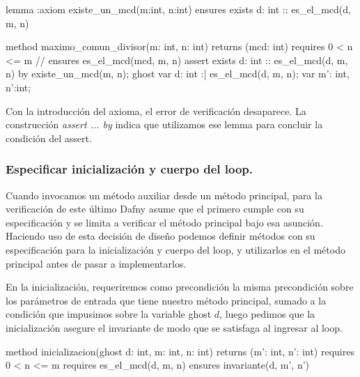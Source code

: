 \documentclass[12pt, a4paper, openany, fleqn]{book}
\begin{document}
    \begin{greenbox}
    \begin{dafny}[gobble=8]
        lemma {:axiom} existe_un_mcd(m:int, n:int)
            ensures exists d: int :: es_el_mcd(d, m, n)

        method maximo_comun_divisor(m: int, n: int) returns (mcd: int)
            requires 0 < n <= m
            // ensures es_el_mcd(mcd, m, n)
        {
            assert exists d: int :: es_el_mcd(d, m, n) by {
                existe_un_mcd(m, n);
            }
            ghost var d: int :| es_el_mcd(d, m, n);
            var m': int, n':int;
        }
    \end{dafny}
    \end{greenbox}

    Con la introducción del axioma, el error de verificación desaparece. La construcción \textit{assert ... by} indica que utilizamos ese lemma para concluir la condición del assert.

    \subsubsection{Especificar inicialización y cuerpo del loop.}

    Cuando invocamos un método auxiliar desde un método principal, para la verificación de este último Dafny asume que el primero cumple con su especificación y se limita a verificar el método principal bajo esa asunción. Haciendo uso de esta decisión de diseño podemos definir métodos con su especificación para la inicialización y cuerpo del loop, y utilizarlos en el método principal antes de pasar a implementarlos.

    En la inicialización, requeriremos como precondición la misma precondición sobre los parámetros de entrada que tiene nuestro método principal, sumado a la condición que impusimos sobre la variable ghost $d$, luego pedimos que la inicialización asegure el invariante de modo que se satisfaga al ingresar al loop.

    \begin{greenbox}
    \begin{dafny}[gobble=8]
        method inicializacion(ghost d: int, m: int, n: int)
            returns (m': int, n': int)
            requires 0 < n <= m
            requires es_el_mcd(d, m, n)
            ensures invariante(d, m', n')
    \end{dafny}
    \end{greenbox}
\end{document}
